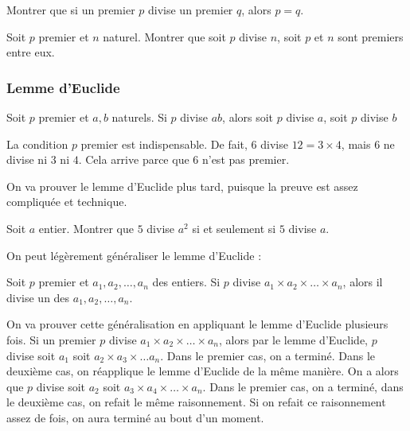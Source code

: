 \begin{exo}
Montrer que si un premier $p$ divise un premier $q$, alors $p=q$.
\end{exo}


\begin{exo}
Soit $p$ premier et $n$ naturel. Montrer que soit $p$ divise $n$, soit $p$ et $n$ sont premiers entre eux.
\end{exo}


\subsubsection{Lemme d'Euclide}


\begin{lem}
Soit $p$ premier et $a, b$ naturels. Si $p$ divise $ab$, alors soit $p$ divise $a$, soit $p$ divise $b$
\end{lem}

\begin{rem}
La condition $p$ premier est indispensable. De fait, $6$ divise $12 = 3 \times 4$, mais $6$ ne divise ni $3$ ni $4$. Cela arrive parce que $6$ n'est pas premier.
\end{rem}

On va prouver le lemme d'Euclide plus tard, puisque la preuve est assez compliquée et technique.


\begin{exo}
Soit $a$ entier.
Montrer que $5$ divise $a^2$ si et seulement si $5$ divise $a$.
\end{exo}


On peut légèrement généraliser le lemme d'Euclide :

\begin{thm}
Soit $p$ premier et $a_1, a_2, \dots, a_n$ des entiers. Si $p$ divise $a_1 \times a_2 \times \dots \times a_n$, alors il divise un des $a_1, a_2, \dots, a_n$.
\end{thm}

\begin{preuve}
On va prouver cette généralisation en appliquant le lemme d'Euclide plusieurs fois.
Si un premier $p$ divise $a_1 \times a_2 \times \dots \times a_n$, alors par le lemme d'Euclide, $p$ divise soit $a_1$ soit $a_2 \times a_3 \times \dots a_n$. Dans le premier cas, on a terminé. Dans le deuxième cas, on réapplique le lemme d'Euclide de la même manière. On a alors que $p$ divise soit $a_2$ soit $a_3 \times a_4 \times \dots \times a_n$. Dans le premier cas, on a terminé, dans le deuxième cas, on refait le même raisonnement. Si on refait ce raisonnement assez de fois, on aura terminé au bout d'un moment.
\end{preuve}

